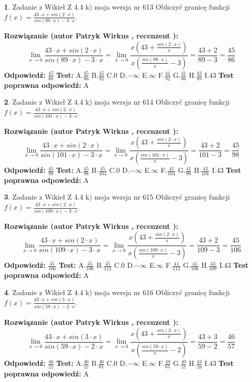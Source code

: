 \documentclass[12pt, a4paper]{article}
\theoremstyle{definition} %
\newtheorem{zad}{}
\newcommand{\zadStart}[1]{\begin{zad}#1\newline}
\newcommand{\zadStop}{\end{zad}}
\newcommand{\rozwStart}[2]{\noindent \textbf{Rozwiązanie (autor #1 , recenzent #2): }\newline}
\newcommand{\rozwStop}{\newline}
\newcommand{\odpStart}{\noindent \textbf{Odpowiedź:}\newline}
\newcommand{\odpStop}{\newline}
\newcommand{\testStart}{\noindent \textbf{Test:}\newline}
\newcommand{\testStop}{\newline}
\newcommand{\kluczStart}{\noindent \textbf{Test poprawna odpowiedź:}\newline}
\newcommand{\kluczStop}{\newline}
\begin{document}
\zadStart{Zadanie z Wikieł Z 4.4 k) moja wersja nr 613}
Obliczyć granicę funkcji $f(x)=\frac{43\cdot x +sin(2\cdot x)}{sin(89\cdot x) -3\cdot x}$.
\zadStop
\rozwStart{Patryk Wirkus}{}
$$\lim\limits_{x\to 0}\frac{43\cdot x +sin(2\cdot x)}{sin(89\cdot x) -3\cdot x}
=\lim\limits_{x\to 0}\frac{x(43+\frac{sin(2\cdot x)}{x})}{x(\frac{sin(89\cdot x)}{x}-3)}
=\frac{43+2}{89-3} = \frac{45}{86}$$
\rozwStop
\odpStart
$\frac{45}{86}$
\odpStop
\testStart
A.$\frac{45}{86}$
B.$\frac{45}{92}$
C.$0$
D.$-\infty$
E.$\infty$
F.$\frac{41}{92}$
G.$\frac{41}{86}$
H.$\frac{43}{89}$
I.$43$
\testStop
\kluczStart
A
\kluczStop



\zadStart{Zadanie z Wikieł Z 4.4 k) moja wersja nr 614}
Obliczyć granicę funkcji $f(x)=\frac{43\cdot x +sin(2\cdot x)}{sin(101\cdot x) -3\cdot x}$.
\zadStop
\rozwStart{Patryk Wirkus}{}
$$\lim\limits_{x\to 0}\frac{43\cdot x +sin(2\cdot x)}{sin(101\cdot x) -3\cdot x}
=\lim\limits_{x\to 0}\frac{x(43+\frac{sin(2\cdot x)}{x})}{x(\frac{sin(101\cdot x)}{x}-3)}
=\frac{43+2}{101-3} = \frac{45}{98}$$
\rozwStop
\odpStart
$\frac{45}{98}$
\odpStop
\testStart
A.$\frac{45}{98}$
B.$\frac{45}{104}$
C.$0$
D.$-\infty$
E.$\infty$
F.$\frac{41}{104}$
G.$\frac{41}{98}$
H.$\frac{43}{101}$
I.$43$
\testStop
\kluczStart
A
\kluczStop



\zadStart{Zadanie z Wikieł Z 4.4 k) moja wersja nr 615}
Obliczyć granicę funkcji $f(x)=\frac{43\cdot x +sin(2\cdot x)}{sin(109\cdot x) -3\cdot x}$.
\zadStop
\rozwStart{Patryk Wirkus}{}
$$\lim\limits_{x\to 0}\frac{43\cdot x +sin(2\cdot x)}{sin(109\cdot x) -3\cdot x}
=\lim\limits_{x\to 0}\frac{x(43+\frac{sin(2\cdot x)}{x})}{x(\frac{sin(109\cdot x)}{x}-3)}
=\frac{43+2}{109-3} = \frac{45}{106}$$
\rozwStop
\odpStart
$\frac{45}{106}$
\odpStop
\testStart
A.$\frac{45}{106}$
B.$\frac{45}{112}$
C.$0$
D.$-\infty$
E.$\infty$
F.$\frac{41}{112}$
G.$\frac{41}{106}$
H.$\frac{43}{109}$
I.$43$
\testStop
\kluczStart
A
\kluczStop



\zadStart{Zadanie z Wikieł Z 4.4 k) moja wersja nr 616}
Obliczyć granicę funkcji $f(x)=\frac{43\cdot x +sin(3\cdot x)}{sin(59\cdot x) -2\cdot x}$.
\zadStop
\rozwStart{Patryk Wirkus}{}
$$\lim\limits_{x\to 0}\frac{43\cdot x +sin(3\cdot x)}{sin(59\cdot x) -2\cdot x}
=\lim\limits_{x\to 0}\frac{x(43+\frac{sin(3\cdot x)}{x})}{x(\frac{sin(59\cdot x)}{x}-2)}
=\frac{43+3}{59-2} = \frac{46}{57}$$
\rozwStop
\odpStart
$\frac{46}{57}$
\odpStop
\testStart
A.$\frac{46}{57}$
B.$\frac{46}{61}$
C.$0$
D.$-\infty$
E.$\infty$
F.$\frac{40}{61}$
G.$\frac{40}{57}$
H.$\frac{43}{59}$
I.$43$
\testStop
\kluczStart
A
\kluczStop
\end{document}
